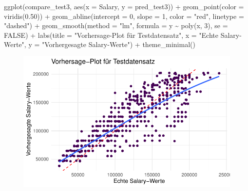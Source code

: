 \documentclass[
  letterpaper,
  DIV=11,
  numbers=noendperiod]{scrartcl}
\newenvironment{Shaded}{\begin{snugshade}}{\end{snugshade}}
\newcommand{\AttributeTok}[1]{\textcolor[rgb]{0.40,0.45,0.13}{#1}}
\newcommand{\ConstantTok}[1]{\textcolor[rgb]{0.56,0.35,0.01}{#1}}
\newcommand{\DecValTok}[1]{\textcolor[rgb]{0.68,0.00,0.00}{#1}}
\newcommand{\FloatTok}[1]{\textcolor[rgb]{0.68,0.00,0.00}{#1}}
\newcommand{\FunctionTok}[1]{\textcolor[rgb]{0.28,0.35,0.67}{#1}}
\newcommand{\NormalTok}[1]{\textcolor[rgb]{0.00,0.23,0.31}{#1}}
\newcommand{\SpecialCharTok}[1]{\textcolor[rgb]{0.37,0.37,0.37}{#1}}
\newcommand{\StringTok}[1]{\textcolor[rgb]{0.13,0.47,0.30}{#1}}
\begin{document}
\begin{Shaded}
\begin{Highlighting}[]
\FunctionTok{ggplot}\NormalTok{(compare\_test3, }\FunctionTok{aes}\NormalTok{(}\AttributeTok{x =}\NormalTok{ Salary, }\AttributeTok{y =}\NormalTok{ pred\_test3)) }\SpecialCharTok{+}
  \FunctionTok{geom\_point}\NormalTok{(}\AttributeTok{color =} \FunctionTok{viridis}\NormalTok{(}\FloatTok{0.50}\NormalTok{)) }\SpecialCharTok{+}
  \FunctionTok{geom\_abline}\NormalTok{(}\AttributeTok{intercept =} \DecValTok{0}\NormalTok{, }\AttributeTok{slope =} \DecValTok{1}\NormalTok{, }\AttributeTok{color =} \StringTok{"red"}\NormalTok{, }\AttributeTok{linetype =} \StringTok{"dashed"}\NormalTok{) }\SpecialCharTok{+}
  \FunctionTok{geom\_smooth}\NormalTok{(}\AttributeTok{method =} \StringTok{"lm"}\NormalTok{, }\AttributeTok{formula =}\NormalTok{ y }\SpecialCharTok{\textasciitilde{}} \FunctionTok{poly}\NormalTok{(x, }\DecValTok{3}\NormalTok{), }\AttributeTok{se =} \ConstantTok{FALSE}\NormalTok{) }\SpecialCharTok{+}
  \FunctionTok{labs}\NormalTok{(}\AttributeTok{title =} \StringTok{"Vorhersage{-}Plot für Testdatensatz"}\NormalTok{,}
       \AttributeTok{x =} \StringTok{"Echte Salary{-}Werte"}\NormalTok{,}
       \AttributeTok{y =} \StringTok{"Vorhergesagte Salary{-}Werte"}\NormalTok{) }\SpecialCharTok{+}
  \FunctionTok{theme\_minimal}\NormalTok{()}
\end{Highlighting}
\end{Shaded}

\begin{figure}[H]

{\centering \includegraphics{main_doc_files/figure-pdf/unnamed-chunk-147-2.pdf}

}

\end{figure}
\end{document}
